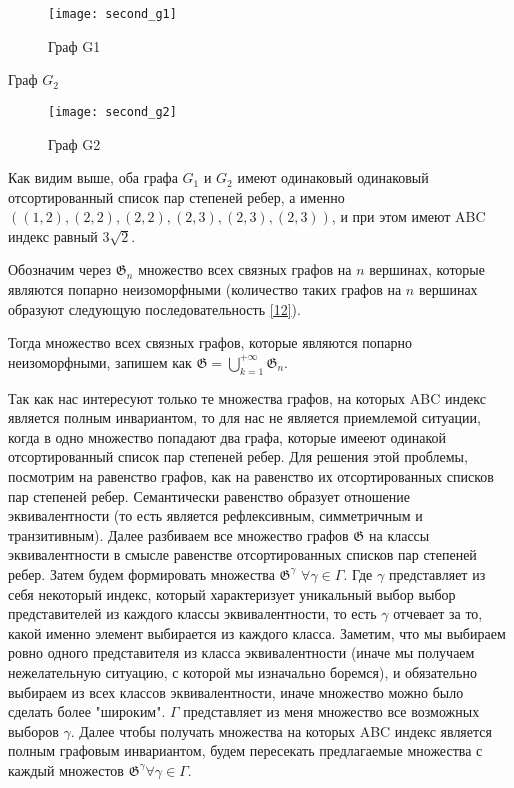\documentclass{article}
\begin{document}
\begin{figure}[h]
\texttt{[image: second\_g1]}
\centering
\caption{Граф G1}
\end{figure}

Граф $G_2$

\begin{figure}[h]
\texttt{[image: second\_g2]}
\centering
\caption{Граф G2}
\end{figure}

Как видим выше, оба графа $G_1$ и $G_2$ имеют одинаковый одинаковый отсортированный список пар степеней ребер, а именно $((1, 2), (2, 2), (2, 2), (2, 3), (2, 3), (2, 3))$, и при этом имеют ABC индекс равный $3 \sqrt{2}$. 

Обозначим через $\mathfrak{G}_n$ множество всех связных графов на $n$ вершинах, которые являются попарно неизоморфными (количество таких графов на $n$ вершинах образуют следующую последовательность \hyperlink{count_graphs}{[12]}). 

Тогда множество всех связных графов, которые являются попарно неизоморфными, запишем как $\mathfrak{G} = \bigcup\limits_{k=1}^{+\infty} \mathfrak{G}_n$.

Так как нас интересуют только те множества графов, на которых ABC индекс является полным инвариантом, то для нас не является приемлемой ситуации, когда в одно множество попадают два графа, которые имееют одинакой отсортированный список пар степеней ребер. Для решения этой проблемы, посмотрим на равенство графов, как на равенство их отсортированных списков пар степеней ребер. Семантически равенство образует отношение эквивалентности (то есть является рефлексивным, симметричным и транзитивным). Далее разбиваем все множество графов $\mathfrak{G}$ на классы эквивалентности в смысле равенстве отсортированных списков пар степеней ребер. Затем будем формировать множества $\mathfrak{G}^{\gamma}$ $\forall \gamma \in \Gamma$. Где $\gamma$ представляет из себя некоторый индекс, который характеризует уникальный выбор выбор представителей из каждого классы эквивалентности, то есть $\gamma$ отчевает за то, какой именно элемент выбирается из каждого класса. Заметим, что мы выбираем ровно одного представителя из класса эквивалентности (иначе мы получаем нежелательную ситуацию, с которой мы изначально боремся), и обязательно выбираем из всех классов эквивалентности, иначе множество можно было сделать более "широким". $\Gamma$ представляет из меня множество все возможных выборов $\gamma$. Далее чтобы получать множества на которых ABC индекс является полным графовым инвариантом, будем пересекать предлагаемые множества с каждый множестов $\mathfrak{G}^{\gamma} \forall \gamma \in \Gamma$. 
\end{document}
